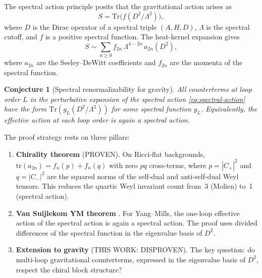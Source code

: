 \documentclass[11pt,a4paper]{article}
\newcommand{\Tr}{\mathrm{Tr}}
\newcommand{\tr}{\mathrm{tr}}
\newtheorem{conjecture}[theorem]{Conjecture}
\theoremstyle{definition}
\begin{document}
The spectral action principle \cite{CC1996,CC2006} posits that the
gravitational action arises as
\begin{equation}\label{eq:spectral-action}
  S = \Tr\bigl(f(D^2/\Lambda^2)\bigr),
\end{equation}
where $D$ is the Dirac operator of a spectral triple $(A,H,D)$, $\Lambda$ is
the spectral cutoff, and $f$ is a positive spectral function.  The heat-kernel
expansion gives
\begin{equation}\label{eq:heat-kernel}
  S \sim \sum_{n \geq 0} f_{2n}\, \Lambda^{4-2n}\, a_{2n}(D^2),
\end{equation}
where $a_{2n}$ are the Seeley--DeWitt coefficients and $f_{2n}$ are the
momenta of the spectral function.

\begin{conjecture}[Spectral renormalizability for gravity]
\label{conj:spectral-renorm}
All counterterms at loop order $L$ in the perturbative expansion of the
spectral action \eqref{eq:spectral-action} have the form
$\Tr(g_L(D^2/\Lambda^2))$ for some spectral function $g_L$.  Equivalently,
the effective action at each loop order is again a spectral action.
\end{conjecture}

The proof strategy rests on three pillars:

\begin{enumerate}[label=\textbf{Pillar \arabic*},leftmargin=3.5em]
\item \textbf{Chirality theorem} (\textcolor{proven}{PROVEN}).
  On Ricci-flat backgrounds, $\tr(a_{2n}) = f_n(p) + f_n(q)$ with zero $pq$
  cross-terms, where $p = |C_+|^2$ and $q = |C_-|^2$ are the squared norms
  of the self-dual and anti-self-dual Weyl tensors.  This reduces the quartic
  Weyl invariant count from~3 (Molien) to~1 (spectral action).

\item \textbf{Van Suijlekom YM theorem} \cite{vS2011,vNvS2021}.
  For Yang--Mills, the one-loop effective action of the spectral action is again
  a spectral action.  The proof uses divided differences of the spectral
  function in the eigenvalue basis of $D^2$.

\item \textbf{Extension to gravity} (\textcolor{disproven}{THIS WORK: DISPROVEN}).
  The key question: do multi-loop gravitational counterterms, expressed in the
  eigenvalue basis of $D^2$, respect the chiral block structure?
\end{enumerate}
\end{document}
